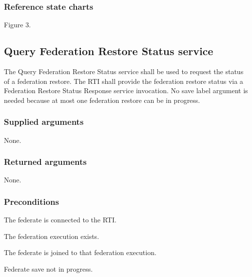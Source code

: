\subsubsection{Reference state charts}

\begin{stdalphalist}
    \item Figure 3.
\end{stdalphalist}

\subsection{Query Federation Restore Status service}

The Query Federation Restore Status service shall be used to request the status of a federation restore. The RTI shall provide the federation restore status via a Federation Restore Status Response \rtiinitiated{} service invocation. No save label argument is needed because at most one federation restore can be in progress.

\subsubsection{Supplied arguments}

\begin{stdalphalist}
    \item None.
\end{stdalphalist}

\subsubsection{Returned arguments}

\begin{stdalphalist}
    \item None.
\end{stdalphalist}

\subsubsection{Preconditions}

\begin{stdalphalist}
    \item The federate is connected to the RTI.
    \item The federation execution exists.
    \item The federate is joined to that federation execution.
    \item Federate save not in progress.
\end{stdalphalist}

